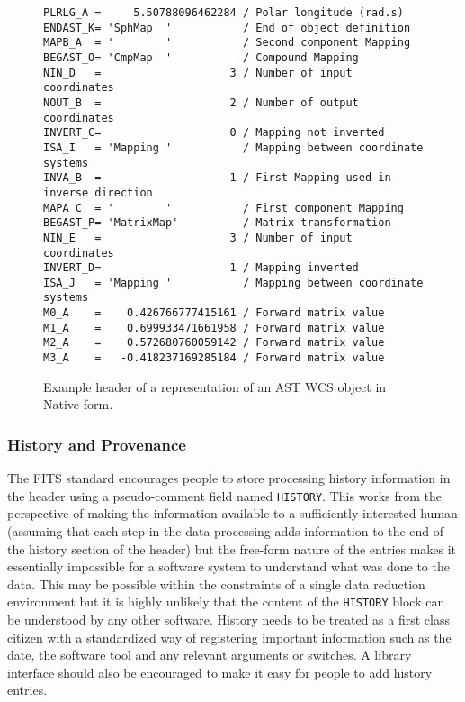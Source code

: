 \documentclass[final,authoryear,5p,times,twocolumn]{elsarticle}
\begin{document}
\begin{figure*}
\begin{minipage}{\textwidth}
\begin{center}
\begin{verbatim}
PLRLG_A =     5.50788096462284 / Polar longitude (rad.s)
ENDAST_K= 'SphMap  '           / End of object definition
MAPB_A  = '        '           / Second component Mapping
BEGAST_O= 'CmpMap  '           / Compound Mapping
NIN_D   =                    3 / Number of input coordinates
NOUT_B  =                    2 / Number of output coordinates
INVERT_C=                    0 / Mapping not inverted
ISA_I   = 'Mapping '           / Mapping between coordinate systems
INVA_B  =                    1 / First Mapping used in inverse direction
MAPA_C  = '        '           / First component Mapping
BEGAST_P= 'MatrixMap'          / Matrix transformation
NIN_E   =                    3 / Number of input coordinates
INVERT_D=                    1 / Mapping inverted
ISA_J   = 'Mapping '           / Mapping between coordinate systems
M0_A    =    0.426766777415161 / Forward matrix value
M1_A    =    0.699933471661958 / Forward matrix value
M2_A    =    0.572680760059142 / Forward matrix value
M3_A    =   -0.418237169285184 / Forward matrix value
\end{verbatim}
\end{center}
\caption{Example header of a representation of an AST WCS object in
  Native form.}
\label{fig:asthead}
\end{minipage}
\end{figure*}


\subsubsection{History and Provenance}


The FITS standard encourages people to store processing history
information in the header using a pseudo-comment field named
\texttt{HISTORY}. This works from the perspective of making the information
available to a sufficiently interested human (assuming that each step in the
data processing adds information to the end of the history section of the
header) but the free-form nature of the entries makes it essentially
impossible for a software system to understand what was done to the data.
This may be possible within the constraints of a single data reduction
environment but it is highly unlikely that the content of the
\texttt{HISTORY} block can be understood by any other software. History
needs to be treated as a first class citizen with a standardized way of
registering important information such as the date, the software tool and
any relevant arguments or switches. A library interface should also be
encouraged to make it easy for people to add history entries.
\end{document}

